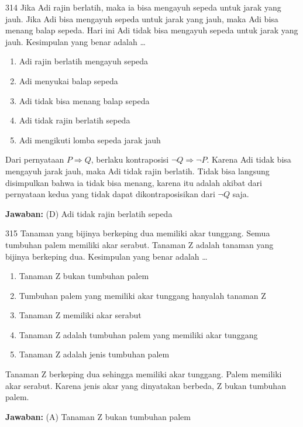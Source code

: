 \documentclass[11pt]{article}
\newenvironment{pil}{\begin{enumerate}[label=(\Alph*),leftmargin=*,itemsep=1pt,topsep=3pt]}{\end{enumerate}}
\newcommand{\jw}[1]{\par\smallskip\begin{jawbox}\textbf{Jawaban:} #1\end{jawbox}}
\begin{document}
\begin{soalbox}{3}{14}
Jika Adi rajin berlatih, maka ia bisa mengayuh sepeda untuk jarak yang jauh. Jika Adi bisa mengayuh sepeda untuk jarak yang jauh, maka Adi bisa menang balap sepeda. Hari ini Adi tidak bisa mengayuh sepeda untuk jarak yang jauh. Kesimpulan yang benar adalah \ldots
\begin{pil}\item Adi rajin berlatih mengayuh sepeda \item Adi menyukai balap sepeda \item Adi tidak bisa menang balap sepeda \item Adi tidak rajin berlatih sepeda \item Adi mengikuti lomba sepeda jarak jauh\end{pil}
\end{soalbox}
\begin{pembox}
Dari pernyataan $P\Rightarrow Q$, berlaku kontraposisi $\neg Q\Rightarrow\neg P$. Karena Adi tidak bisa mengayuh jarak jauh, maka Adi tidak rajin berlatih. Tidak bisa langsung disimpulkan bahwa ia tidak bisa menang, karena itu adalah akibat dari pernyataan kedua yang tidak dapat dikontraposisikan dari $\neg Q$ saja.
\jw{(D) Adi tidak rajin berlatih sepeda}
\end{pembox}

\begin{soalbox}{3}{15}
Tanaman yang bijinya berkeping dua memiliki akar tunggang. Semua tumbuhan palem memiliki akar serabut. Tanaman Z adalah tanaman yang bijinya berkeping dua. Kesimpulan yang benar adalah \ldots
\begin{pil}\item Tanaman Z bukan tumbuhan palem \item Tumbuhan palem yang memiliki akar tunggang hanyalah tanaman Z \item Tanaman Z memiliki akar serabut \item Tanaman Z adalah tumbuhan palem yang memiliki akar tunggang \item Tanaman Z adalah jenis tumbuhan palem\end{pil}
\end{soalbox}
\begin{pembox}
Tanaman Z berkeping dua sehingga memiliki akar tunggang. Palem memiliki akar serabut. Karena jenis akar yang dinyatakan berbeda, Z bukan tumbuhan palem.
\jw{(A) Tanaman Z bukan tumbuhan palem}
\end{pembox}
\end{document}
